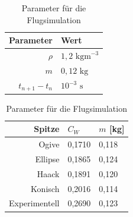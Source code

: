 \documentclass[10pt,a4paper]{article}
\begin{document}
\begin{table}[H]
\caption{Parameter für die Flugsimulation}
\begin{subtable}[b]{.49\textwidth}
	\begin{tabular}{r|l}
	\toprule
	Parameter	& Wert		\\
	\midrule
	$\rho$ 		& $1,2 \text{ kgm}^{-3}$ \\
	$m$			& $0,12 \text{ kg}$ \\
	$t_{n+1}-t_{n}$ & $10^{-3} \text{ s}$ \\
	\bottomrule
	\end{tabular}
\end{subtable}
\begin{subtable}[l]{.49\textwidth}
	\label{tab-Simulationsparameter}
	\begin{tabular}{r|ll}
	\toprule
	Spitze			& $C_{W}$		& $m$ [kg]	\\
	\midrule
	Ogive			& 0,1710	& 0,118 \\
	Ellipse			& 0,1865	& 0,124 \\
	Haack			& 0,1891	& 0,120 \\
	Konisch			& 0,2016	& 0,114 \\
	Experimentell	& 0,2690	& 0,123 \\
	\bottomrule
	\end{tabular}
\end{subtable}
\end{table}
\end{document}
